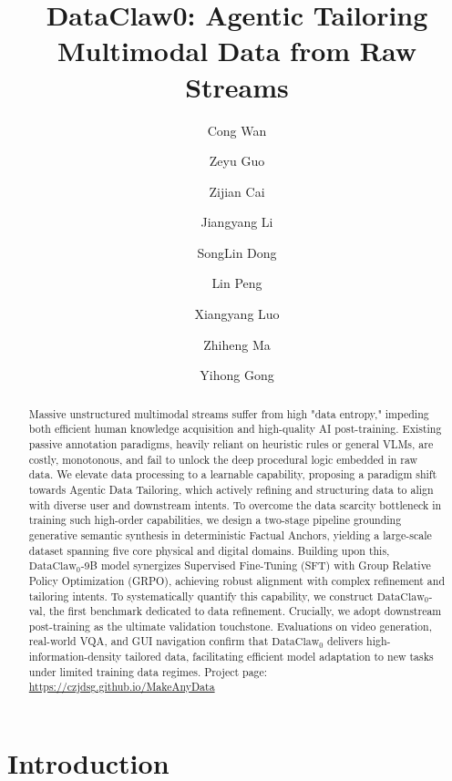 \documentclass{llmxive}
\title{DataClaw0: Agentic Tailoring Multimodal Data from Raw Streams}
\author{Cong Wan \and Zeyu Guo \and Zijian Cai \and Jiangyang Li \and SongLin Dong \and Lin Peng \and Xiangyang Luo \and Zhiheng Ma \and Yihong Gong}
\providecommand{\method}{TCF-Proto}
\begin{document}
\maketitle
\begin{abstract}
Massive unstructured multimodal streams suffer from high "data entropy," impeding both efficient human knowledge acquisition and high-quality AI post-training. Existing passive annotation paradigms, heavily reliant on heuristic rules or general VLMs, are costly, monotonous, and fail to unlock the deep procedural logic embedded in raw data. We elevate data processing to a learnable capability, proposing a paradigm shift towards Agentic Data Tailoring, which actively refining and structuring data to align with diverse user and downstream intents. To overcome the data scarcity bottleneck in training such high-order capabilities, we design a two-stage pipeline grounding generative semantic synthesis in deterministic Factual Anchors, yielding a large-scale dataset spanning five core physical and digital domains. Building upon this, $\text{DataClaw}_0$-9B model synergizes Supervised Fine-Tuning (SFT) with Group Relative Policy Optimization (GRPO), achieving robust alignment with complex refinement and tailoring intents. To systematically quantify this capability, we construct $\text{DataClaw}_0$-val, the first benchmark dedicated to data refinement. Crucially, we adopt downstream post-training as the ultimate validation touchstone. Evaluations on video generation, real-world VQA, and GUI navigation confirm that $\text{DataClaw}_0$ delivers high-information-density tailored data, facilitating efficient model adaptation to new tasks under limited training data regimes. Project page: \url{https://czjdsg.github.io/MakeAnyData}
\end{abstract}
\renewcommand{\method}{TCF-Proto}



\section{Introduction}
\end{document}
